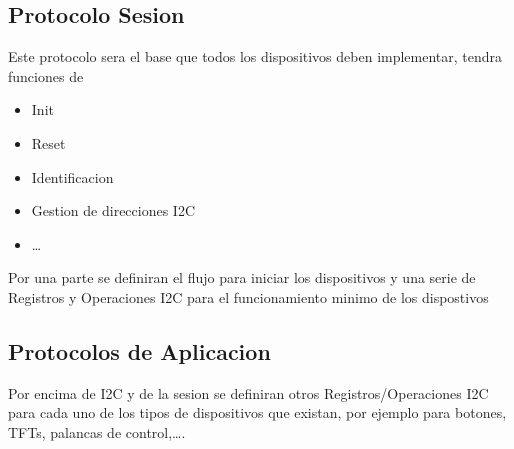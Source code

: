 \subsection{Protocolo Sesion}
Este protocolo sera el base que todos los dispositivos deben implementar, tendra funciones de
\begin{itemize}
    \item Init
    \item Reset
    \item Identificacion
    \item Gestion de direcciones I2C
    \item \dots
\end{itemize}

Por una parte se definiran el flujo para iniciar los dispositivos y una serie de Registros y Operaciones I2C para
el funcionamiento minimo de los dispostivos

\subsection{Protocolos de Aplicacion}

Por encima de I2C y de la sesion se definiran otros Registros/Operaciones I2C para cada uno de los tipos de
dispositivos que existan,  por ejemplo para botones, TFTs, palancas de control,\dots.
